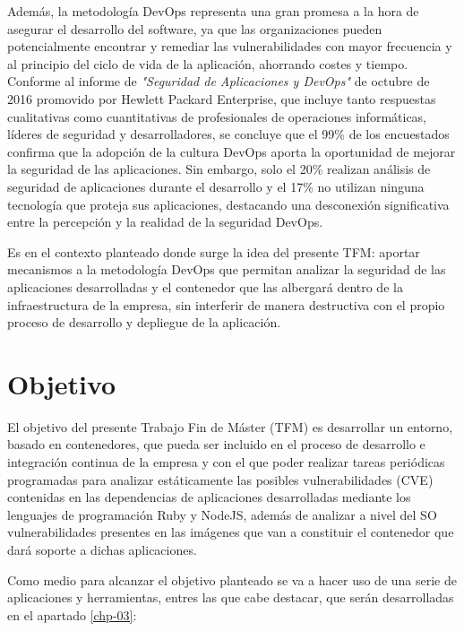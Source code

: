Además, la metodología	 \gls{DevOps} representa una gran promesa a la hora de asegurar el desarrollo del software, ya que las organizaciones pueden potencialmente encontrar y remediar las vulnerabilidades con mayor frecuencia y al principio del ciclo de vida de la aplicación, ahorrando costes y tiempo. Conforme al informe de  \textit{"Seguridad de Aplicaciones y DevOps"} de octubre de 2016 promovido por Hewlett Packard Enterprise\cite{hpe2016}, que incluye tanto respuestas cualitativas como cuantitativas de profesionales de operaciones informáticas, líderes de seguridad y desarrolladores, se concluye que el 99\% de los encuestados confirma que la adopción de la cultura \gls{DevOps} aporta la oportunidad de mejorar la seguridad de las aplicaciones. Sin embargo, solo el 20\% realizan análisis de seguridad de aplicaciones durante el desarrollo y el 17\% no utilizan ninguna tecnología que proteja sus aplicaciones, destacando una desconexión significativa entre la percepción y la realidad de la seguridad \gls{DevOps}.

Es en el contexto planteado donde surge la idea del presente \gls{TFM}: aportar mecanismos a la metodología \gls{DevOps} que permitan analizar la seguridad de las aplicaciones desarrolladas y el contenedor que las albergará dentro de la infraestructura de la empresa, sin interferir de manera destructiva con el propio proceso de desarrollo y depliegue de la aplicación.

\section{Objetivo}

El objetivo del presente Trabajo Fin de Máster (\gls{TFM}) es desarrollar un entorno, basado en contenedores, que pueda ser incluido en el proceso de desarrollo e integración continua de la empresa y con el que poder realizar tareas periódicas programadas para analizar estáticamente las posibles vulnerabilidades (\gls{CVE}) contenidas en las dependencias de aplicaciones desarrolladas mediante los lenguajes de programación Ruby y NodeJS, además de analizar a nivel del SO vulnerabilidades presentes en las imágenes que van a constituir el contenedor que dará soporte a dichas aplicaciones.

Como medio para alcanzar el objetivo planteado se va a hacer uso de una serie de aplicaciones y herramientas, entres las que cabe destacar, que serán desarrolladas en el apartado \ref{chp-03}:

